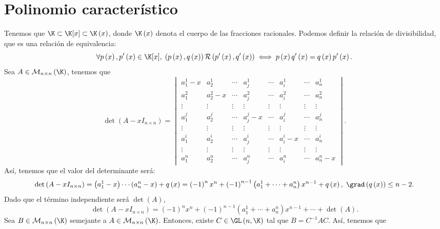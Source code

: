 \section{Polinomio característico}
Tenemos que $\displaystyle \K \subset \K[x] \subset \K\left(x\right) $, donde $\displaystyle \K\left(x\right)$ denota el cuerpo de las fracciones racionales. Podemos definir la relación de divisibilidad, que es una relación de equivalencia:
\[\forall p\left(x\right), p'\left(x\right) \in \K[x], \; \left( p\left(x\right), q\left(x\right)\right) \mathcal{R}\left( p'\left(x\right), q'\left(x\right)\right) \iff p\left(x\right)q'\left(x\right) = q\left(x\right) p'\left(x\right).\]
Sea $\displaystyle A \in \mathcal{M}_{n \times n}\left(\K\right) $, tenemos que 
\[\det\left(A - x I_{n \times n}\right) = \begin{vmatrix} a_{1}^{1}-x & a^{1}_{2} & \cdots & a^{1}_{j} & \cdots & a^{1}_{i} & \cdots & a^{1}_{n} \\
a^{2}_{1} & a^{2}_{2} - x & \cdots & a^{2}_{j} & \cdots & a^{2}_{i} & \cdots & a^{2}_{n}\\
\vdots & \vdots & \vdots & \vdots & \vdots & \vdots & \vdots & \vdots \\
a^{j}_{1} & a^{j}_{2} & \cdots & a^{j}_{j}-x & \cdots & a^{j}_{i} & \cdots & a^{j}_{n} \\
\vdots & \vdots & \vdots & \vdots & \vdots & \vdots & \vdots & \vdots \\
a^{i}_{1} & a^{i}_{2} & \cdots & a^{i}_{j} & \cdots & a^{i}_{i} - x & \cdots & a^{i}_{n} \\
\vdots & \vdots & \vdots & \vdots & \vdots & \vdots & \vdots & \vdots \\
a^{n}_{1} & a^{n}_{2} & \cdots & a^{n}_{j} & \cdots & a^{n}_{i} & \cdots & a^{n}_{n} - x
\end{vmatrix}  .\]
Así, tenemos que el valor del determinante será:
\[ \det\left(A - x I_{n \times n}\right) = \left(a^{1}_{1} - x\right)\cdots\left(a^{n}_{n}-x\right)+ q\left(x\right) = \left(-1\right)^{n}x^{n} + \left(-1\right)^{n-1}\left(a^{1}_{1}+ \cdots + a^{n}_{n}\right)x^{n-1} + q\left(x\right), \; \grad\left(q\left(x\right)\right) \leq n - 2 .\]
Dado que el término independiente será $\displaystyle \det\left(A\right) $,
\[\det\left(A - xI_{n \times n}\right) = \left(-1\right)^{n}x^{n} + \left(-1\right)^{n - 1}\left(a^{1}_{1} + \cdots + a^{n}_{n}\right)x^{n-1} + \cdots + \det\left(A\right) .\]
Sea $\displaystyle B \in \mathcal{M}_{n \times n}\left(\K\right) $ semejante a $\displaystyle A \in \mathcal{M}_{n \times n}\left(\K\right) $. Entonces, existe $\displaystyle C \in \GL\left(n, \K\right) $ tal que $\displaystyle B = C^{-1}AC $. Así, tenemos que 

